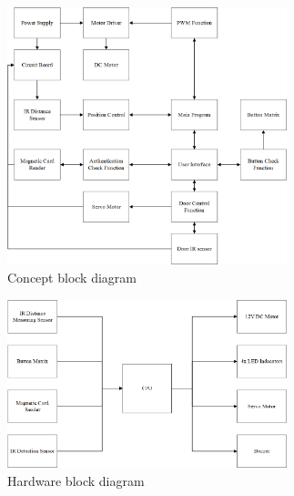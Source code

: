 \documentclass{article}
\begin{document}
	    \begin{figure}[!ht]
	        \begin{center}
		    \includegraphics[width=230pt]{cbd.png}
		    \caption{Concept block diagram}
	    	\label{fig:concept_block_diagram}
	    	\end{center}
	    \end{figure}
	
    	\begin{figure}[!ht]
	        \begin{center}
	    	\includegraphics[width=230pt]{hwbd.png}
	    	\caption{Hardware block diagram}
	    	\label{fig:hardware_block_diagram}
	    	\end{center}
	    \end{figure}
	
\end{document}
